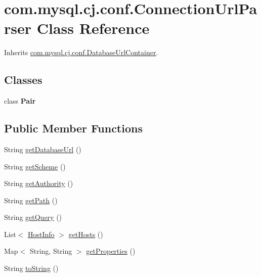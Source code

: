 \hypertarget{classcom_1_1mysql_1_1cj_1_1conf_1_1_connection_url_parser}{}\section{com.\+mysql.\+cj.\+conf.\+Connection\+Url\+Parser Class Reference}
\label{classcom_1_1mysql_1_1cj_1_1conf_1_1_connection_url_parser}


Inherits \mbox{\hyperlink{interfacecom_1_1mysql_1_1cj_1_1conf_1_1_database_url_container}{com.\+mysql.\+cj.\+conf.\+Database\+Url\+Container}}.

\subsection*{Classes}
\begin{DoxyCompactItemize}
\item 
class {\bfseries Pair}
\end{DoxyCompactItemize}
\subsection*{Public Member Functions}
\begin{DoxyCompactItemize}
\item 
String \mbox{\hyperlink{classcom_1_1mysql_1_1cj_1_1conf_1_1_connection_url_parser_af08f3c184e60422f883d7400e326e3e1}{get\+Database\+Url}} ()
\item 
String \mbox{\hyperlink{classcom_1_1mysql_1_1cj_1_1conf_1_1_connection_url_parser_a3dcb0a44f5d1cdec45cafe6476f7d5f8}{get\+Scheme}} ()
\item 
String \mbox{\hyperlink{classcom_1_1mysql_1_1cj_1_1conf_1_1_connection_url_parser_afc563e2c255dbf29c24fd6f71d0b8122}{get\+Authority}} ()
\item 
String \mbox{\hyperlink{classcom_1_1mysql_1_1cj_1_1conf_1_1_connection_url_parser_a7c7838a4b6c4939f565aa9cd91279ba0}{get\+Path}} ()
\item 
String \mbox{\hyperlink{classcom_1_1mysql_1_1cj_1_1conf_1_1_connection_url_parser_a8983aea4b0aae226a364e4a25ee91c1c}{get\+Query}} ()
\item 
List$<$ \mbox{\hyperlink{classcom_1_1mysql_1_1cj_1_1conf_1_1_host_info}{Host\+Info}} $>$ \mbox{\hyperlink{classcom_1_1mysql_1_1cj_1_1conf_1_1_connection_url_parser_a1e8d19de90145bad47380341900627b0}{get\+Hosts}} ()
\item 
Map$<$ String, String $>$ \mbox{\hyperlink{classcom_1_1mysql_1_1cj_1_1conf_1_1_connection_url_parser_a30950205d2cb4d966d66bcdcd4047918}{get\+Properties}} ()
\item 
String \mbox{\hyperlink{classcom_1_1mysql_1_1cj_1_1conf_1_1_connection_url_parser_add731ba88032454b1c17aaca658cd75e}{to\+String}} ()
\end{DoxyCompactItemize}
